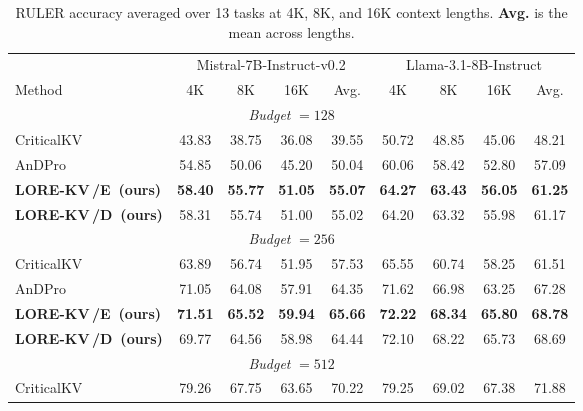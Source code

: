 \documentclass{article} %
\newcommand{\best}[1]{\textcolor{bestblue}{\textbf{#1}}}
\newcommand{\second}[1]{\textcolor{secondorange}{#1}}
\newcommand{\lorekvE}{LORE-KV\,/E}
\newcommand{\lorekvD}{LORE-KV\,/D}
\begin{document}
\begin{table}[t]
\caption{RULER accuracy averaged over 13 tasks at 4K, 8K, and 16K context lengths.
\textbf{Avg.} is the mean across lengths.}
\label{tab:ruler_main}
\centering
\begin{tabular}{lcccccccc}
\toprule
& \multicolumn{4}{c}{Mistral-7B-Instruct-v0.2}
& \multicolumn{4}{c}{Llama-3.1-8B-Instruct} \\
\cmidrule(lr){2-5}\cmidrule(lr){6-9}
Method & 4K & 8K & 16K & Avg. & 4K & 8K & 16K & Avg. \\
\midrule

\multicolumn{9}{c}{\textit{Budget} $=128$} \\
\midrule
CriticalKV
& 43.83 & 38.75 & 36.08 & 39.55
& 50.72 & 48.85 & 45.06 & 48.21 \\

AnDPro
& 54.85 & 50.06 & 45.20 & 50.04
& 60.06 & 58.42 & 52.80 & 57.09 \\

\textbf{\lorekvE\ (ours)}
& \best{58.40} & \best{55.77} & \best{51.05} & \best{55.07}
& \best{64.27} & \best{63.43} & \best{56.05} & \best{61.25} \\

\textbf{\lorekvD\ (ours)}
& \second{58.31} & \second{55.74} & \second{51.00} & \second{55.02}
& \second{64.20} & \second{63.32} & \second{55.98} & \second{61.17} \\

\midrule
\multicolumn{9}{c}{\textit{Budget} $=256$} \\
\midrule
CriticalKV
& 63.89 & 56.74 & 51.95 & 57.53
& 65.55 & 60.74 & 58.25 & 61.51 \\

AnDPro
& \second{71.05} & 64.08 & 57.91 & 64.35
& 71.62 & 66.98 & 63.25 & 67.28 \\

\textbf{\lorekvE\ (ours)}
& \best{71.51} & \best{65.52} & \best{59.94} & \best{65.66}
& \best{72.22} & \best{68.34} & \best{65.80} & \best{68.78} \\

\textbf{\lorekvD\ (ours)}
& 69.77 & \second{64.56} & \second{58.98} & \second{64.44}
& \second{72.10} & \second{68.22} & \second{65.73} & \second{68.69} \\

\midrule
\multicolumn{9}{c}{\textit{Budget} $=512$} \\
\midrule
CriticalKV
& 79.26 & 67.75 & 63.65 & 70.22
& 79.25 & 69.02 & 67.38 & 71.88 \\


\end{tabular}
\end{table}
\end{document}
